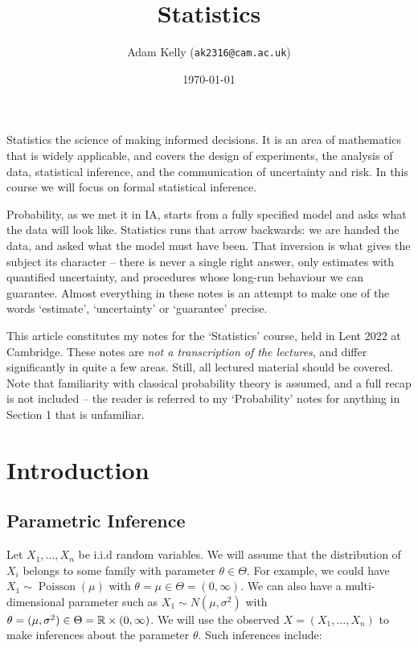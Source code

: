 \documentclass[a4paper]{scrartcl}
\title{Statistics}
\author{Adam Kelly (\texttt{ak2316@cam.ac.uk})}
\date{\today}
\newcommand{\Poisson}{\operatorname{Poisson}}
\begin{document}
\maketitle

Statistics the science of making informed decisions. It is an area of mathematics that is widely applicable, and covers the design of experiments, the analysis of data, statistical inference, and the communication of uncertainty and risk.
In this course we will focus on formal statistical inference.

Probability, as we met it in IA, starts from a fully specified model and asks what the data will look like. Statistics runs that arrow backwards: we are handed the data, and asked what the model must have been. That inversion is what gives the subject its character -- there is never a single right answer, only estimates with quantified uncertainty, and procedures whose long-run behaviour we can guarantee. Almost everything in these notes is an attempt to make one of the words `estimate', `uncertainty' or `guarantee' precise.

This article constitutes my notes for the `Statistics' course, held in Lent 2022 at Cambridge. These notes are \emph{not a transcription of the lectures}, and differ significantly in quite a few areas. Still, all lectured material should be covered.
Note that familiarity with classical probability theory is assumed, and a full recap is not included -- the reader is referred to my `Probability' notes for anything in Section 1 that is unfamiliar.


\tableofcontents

\section{Introduction}

\subsection{Parametric Inference}

Let $X_1, \dots, X_n$ be i.i.d random variables. We will assume that the distribution of $X_i$ belongs to some family with parameter $\theta \in \Theta$.
For example, we could have $X_1 \sim \Poisson(\mu)$ with $\theta = \mu \in \Theta = (0, \infty)$. We can also have a multi-dimensional parameter such as $X_1 \sim N(\mu, \sigma^2)$ with $\theta = (\mu, \sigma^2) \in \Theta = \mathbb{R} \times (0, \infty)$.
We will use the observed $X = (X_1, \dots, X_n)$ to make inferences about the parameter $\theta$. Such inferences include:
\end{document}
